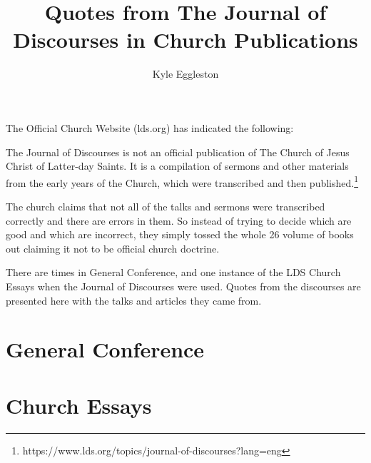 \documentclass{book}
\title{Quotes from The Journal of Discourses in Church Publications}
\author{Kyle Eggleston}
\begin{document}
\maketitle

The Official Church Website (lds.org) has indicated the following:

\begin{displayquote}
The Journal of Discourses is not an official publication of The Church of 
Jesus Christ of Latter-day Saints. It is a compilation of sermons and other 
materials from the early years of the Church, which were transcribed and then 
published.\footnote{
https://www.lds.org/topics/journal-of-discourses?lang=eng  
}
\end{displayquote}

The church claims that not all of the talks and sermons were transcribed 
correctly and there are errors in them. So instead of trying to decide which
are good and which are incorrect, they simply tossed the whole 26 volume
of books out claiming it not to be official church doctrine.

There are times in General Conference, and one instance of the LDS Church 
Essays when the Journal of Discourses were used. Quotes from the discourses 
are presented here with the talks and articles they came from.

\newpage

\newpage

\chapter{General Conference}





























\chapter{Church Essays}

\end{document}
